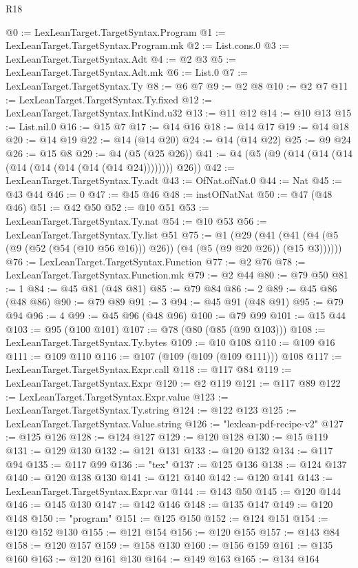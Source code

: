 \begin{lexlean}{R18}
\begin{coremodule}
@0 := LexLeanTarget.TargetSyntax.Program
@1 := LexLeanTarget.TargetSyntax.Program.mk
@2 := List.cons.{0}
@3 := LexLeanTarget.TargetSyntax.Adt
@4 := @2 @3
@5 := LexLeanTarget.TargetSyntax.Adt.mk
@6 := List.{0}
@7 := LexLeanTarget.TargetSyntax.Ty
@8 := @6 @7
@9 := @2 @8
@10 := @2 @7
@11 := LexLeanTarget.TargetSyntax.Ty.fixed
@12 := LexLeanTarget.TargetSyntax.IntKind.u32
@13 := @11 @12
@14 := @10 @13
@15 := List.nil.{0}
@16 := @15 @7
@17 := @14 @16
@18 := @14 @17
@19 := @14 @18
@20 := @14 @19
@22 := @14 (@14 @20)
@24 := @14 (@14 @22)
@25 := @9 @24
@26 := @15 @8
@29 := @4 (@5 (@25 @26))
@41 := @4 (@5 (@9 (@14 (@14 (@14 (@14 (@14 (@14 (@14 (@14 @24)))))))) @26))
@42 := LexLeanTarget.TargetSyntax.Ty.adt
@43 := OfNat.ofNat.{0}
@44 := Nat
@45 := @43 @44
@46 := 0
@47 := @45 @46
@48 := instOfNatNat
@50 := @47 (@48 @46)
@51 := @42 @50
@52 := @10 @51
@53 := LexLeanTarget.TargetSyntax.Ty.nat
@54 := @10 @53
@56 := LexLeanTarget.TargetSyntax.Ty.list @51
@75 := @1
    (@29 (@41 (@41 (@4 (@5 (@9 (@52 (@54 (@10 @56 @16))) @26)) (@4 (@5 (@9 @20 @26)) (@15 @3))))))
@76 := LexLeanTarget.TargetSyntax.Function
@77 := @2 @76
@78 := LexLeanTarget.TargetSyntax.Function.mk
@79 := @2 @44
@80 := @79 @50
@81 := 1
@84 := @45 @81 (@48 @81)
@85 := @79 @84
@86 := 2
@89 := @45 @86 (@48 @86)
@90 := @79 @89
@91 := 3
@94 := @45 @91 (@48 @91)
@95 := @79 @94
@96 := 4
@99 := @45 @96 (@48 @96)
@100 := @79 @99
@101 := @15 @44
@103 := @95 (@100 @101)
@107 := @78 (@80 (@85 (@90 @103)))
@108 := LexLeanTarget.TargetSyntax.Ty.bytes
@109 := @10 @108
@110 := @109 @16
@111 := @109 @110
@116 := @107 (@109 (@109 (@109 @111))) @108
@117 := LexLeanTarget.TargetSyntax.Expr.call
@118 := @117 @84
@119 := LexLeanTarget.TargetSyntax.Expr
@120 := @2 @119
@121 := @117 @89
@122 := LexLeanTarget.TargetSyntax.Expr.value
@123 := LexLeanTarget.TargetSyntax.Ty.string
@124 := @122 @123
@125 := LexLeanTarget.TargetSyntax.Value.string
@126 := "lexlean-pdf-recipe-v2"
@127 := @125 @126
@128 := @124 @127
@129 := @120 @128
@130 := @15 @119
@131 := @129 @130
@132 := @121 @131
@133 := @120 @132
@134 := @117 @94
@135 := @117 @99
@136 := "tex"
@137 := @125 @136
@138 := @124 @137
@140 := @120 @138 @130
@141 := @121 @140
@142 := @120 @141
@143 := LexLeanTarget.TargetSyntax.Expr.var
@144 := @143 @50
@145 := @120 @144
@146 := @145 @130
@147 := @142 @146
@148 := @135 @147
@149 := @120 @148
@150 := "program"
@151 := @125 @150
@152 := @124 @151
@154 := @120 @152 @130
@155 := @121 @154
@156 := @120 @155
@157 := @143 @84
@158 := @120 @157
@159 := @158 @130
@160 := @156 @159
@161 := @135 @160
@163 := @120 @161 @130
@164 := @149 @163
@165 := @134 @164

\end{coremodule}
\end{lexlean}
